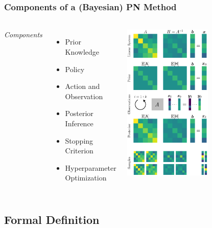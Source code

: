 \documentclass[10pt,usepdftitle=false,aspectratio=169]{beamer}
\begin{document}
\begin{frame}\frametitle{Components of a (Bayesian) PN Method}
	\framesubtitle{}

	\begin{columns}[c,totalwidth=\textwidth]

		\emph{Components}
		\begin{itemize}
			\item Prior Knowledge
			\item Policy
			\item Action and Observation
			\item Posterior Inference
			\item Stopping Criterion
			\item Hyperparameter Optimization

		\end{itemize}

		\centering
		\includegraphics[width=0.6\textwidth]{figures/problinsolve.pdf}

	\end{columns}

\end{frame}

\subsection{Formal Definition}
\end{document}
